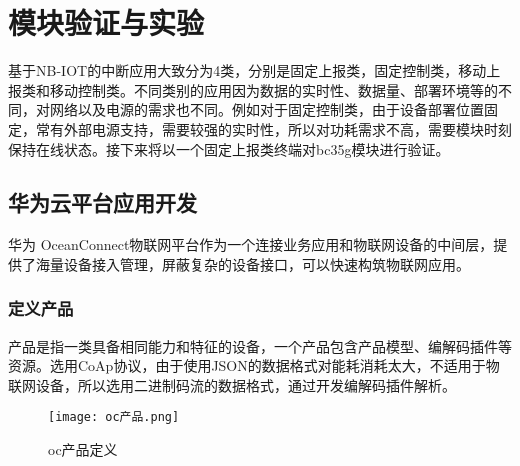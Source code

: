 



\chapter{模块验证与实验}
基于NB-IOT的中断应用大致分为4类，分别是固定上报类，固定控制类，移动上报类和移动控制类。不同类别的应用因为数据的实时性、数据量、部署环境等的不同，对网络以及电源的需求也不同。例如对于固定控制类，由于设备部署位置固定，常有外部电源支持，需要较强的实时性，所以对功耗需求不高，需要模块时刻保持在线状态。接下来将以一个固定上报类终端对bc35g模块进行验证。
\section{华为云平台应用开发}
华为 OceanConnect物联网平台作为一个连接业务应用和物联网设备的中间层，提供了海量设备接入管理，屏蔽复杂的设备接口，可以快速构筑物联网应用。

\subsection{定义产品}
产品是指一类具备相同能力和特征的设备，一个产品包含产品模型、编解码插件等资源。选用CoAp协议，由于使用JSON的数据格式对能耗消耗太大，不适用于物联网设备，所以选用二进制码流的数据格式，通过开发编解码插件解析。
\begin{figure}[H]
    \centering
	\texttt{[image: oc产品.png]}
	\caption{oc产品定义}
	\label{oc产品}
\end{figure}


